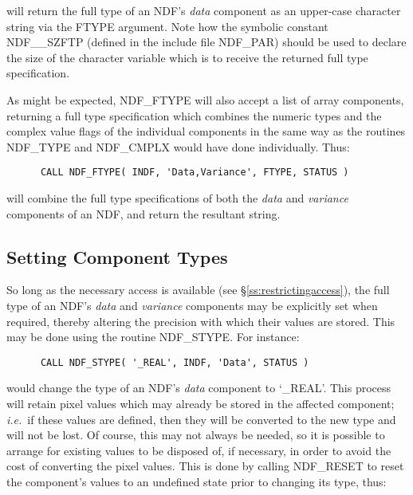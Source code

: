 \documentclass[twoside,11pt]{article}
\newcommand{\htmlref}[2]{#1}
\newcommand{\xlabel}[1]{}
\newcommand{\st}[1]{{\em{#1}}}
\begin{document}
will return the full type of an NDF's \st{data\/} component as an upper-case
character string via the FTYPE argument.
Note how the symbolic constant NDF\_\_SZFTP (defined in the include file
NDF\_PAR) should be used to declare the size of the character variable which
is to receive the returned full type specification.

As might be expected, NDF\_FTYPE will also accept a list of array
components, returning a full type specification which combines the numeric
types and the complex value flags of the individual components in the same
way as the routines \htmlref{NDF\_TYPE}{NDF_TYPE} and \htmlref{NDF\_CMPLX}{NDF_CMPLX} would have done individually. 
Thus:

\small
\begin{verbatim}
      CALL NDF_FTYPE( INDF, 'Data,Variance', FTYPE, STATUS )
\end{verbatim}
\normalsize

will combine the full type specifications of both the \st{data\/} and
\st{variance\/} components of an NDF, and return the resultant string.


\subsection{\xlabel{setting_component_types}\label{ss:stype}Setting Component Types}

So long as the necessary access is available (see
\S\ref{ss:restrictingaccess}), the full type of an NDF's \st{data\/}
and \st{variance\/} components may be explicitly set when required,
thereby altering 
the precision with which their values are stored. 
This may be done using the routine \htmlref{NDF\_STYPE}{NDF_STYPE}.
For instance:

\small
\begin{verbatim}
      CALL NDF_STYPE( '_REAL', INDF, 'Data', STATUS )
\end{verbatim}
\normalsize

would change the type of an NDF's \st{data\/} component to `\_REAL'.
This process will retain pixel values which may already be stored in the
affected component; \st{i.e.}\ if these values are defined, then they will be
converted to the new type and will not be lost. 
Of course, this may not always be needed, so it is possible to arrange for
existing values to be disposed of, if necessary, in order to avoid the cost of
converting the pixel values.
This is done by calling \htmlref{NDF\_RESET}{NDF_RESET} to reset the component's  values to an
undefined state prior to changing its type, thus:
\end{document}
